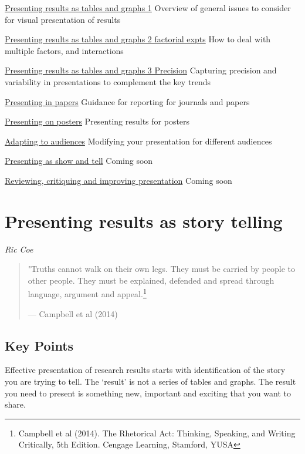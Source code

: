\documentclass[
  titlepage]{book}
\begin{document}
\protect\hyperlink{tablegraph1}{Presenting results as tables and graphs 1}
Overview of general issues to consider for visual presentation of results

\protect\hyperlink{factor}{Presenting results as tables and graphs 2 factorial expts}
How to deal with multiple factors, and interactions

\protect\hyperlink{precision}{Presenting results as tables and graphs 3 Precision}
Capturing precision and variability in presentations to complement the key trends

\protect\hyperlink{papers}{Presenting in papers}
Guidance for reporting for journals and papers

\protect\hyperlink{posters}{Presenting on posters}
Presenting results for posters

\protect\hyperlink{audience}{Adapting to audiences}
Modifying your presentation for different audiences

\protect\hyperlink{showandtell}{Presenting as show and tell}
Coming soon

\protect\hyperlink{review}{Reviewing, critiquing and improving presentation}
Coming soon

\hypertarget{story}{%
\chapter{Presenting results as story telling}\label{story}}

\emph{Ric Coe}

\begin{quote}
"Truths cannot walk on their own legs. They must be carried by people to other people. They must be explained, defended and spread through language, argument and appeal.\footnote{Campbell et al (2014). The Rhetorical Act: Thinking, Speaking, and Writing Critically, 5th Edition. Cengage Learning, Stamford, YUSA}

\hfill --- Campbell et al (2014)
\end{quote}

\hypertarget{key-points}{%
\section{Key Points}\label{key-points}}

Effective presentation of research results starts with identification of the story you are trying to tell. The `result' is not a series of tables and graphs. The result you need to present is something new, important and exciting that you want to share.
\end{document}
